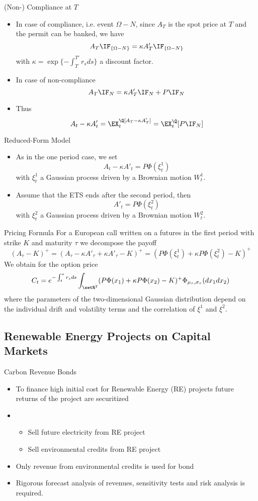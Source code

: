 {(Non-) Compliance at $T$}
\begin{itemize}
\item<1-> In case of compliance, i.e. event $\Omega-N$, since $A_T$ is the spot price at $T$ and the permit can be banked,  we have
$$
A_T\IF_{\{\Omega-N\}}= \kappa A'_T \IF_{\{\Omega-N\}}
$$
with $\kappa= \exp\{-\int_T^{T'}r_s ds\}$ a discount factor.
\item<2-> In case of non-compliance
$$
A_T\IF_{N}= \kappa A'_T \IF_{N} + P\IF_N
$$
\item<3-> Thus
$$
A_t-\kappa A'_t = \EX_t^\Q[A_T-\kappa A'_T]= \EX^\Q_t[P \IF_N]
$$
\end{itemize}



{Reduced-Form Model}
\begin{itemize}
\item<1-> As in the one period case,  we set
$$
A_t-\kappa A'_t = P \Phi(\xi_t^1)
$$
with $\xi^1_t$ a Gaussian process driven by a Brownian motion $W^1_t$.
\item<2-> Assume that the ETS ends after the second period, then
$$
A'_t = P \Phi(\xi^2_t)
$$
with $\xi^2_t$ a Gaussian process driven by a Brownian motion $W^2_t$.
\end{itemize}


{Pricing Formula}
For a European call written on a futures in the first period with strike $K$ and maturity $\tau$ we decompose the payoff
$$
(A_\tau-K)^+= (A_\tau - \kappa A'_\tau + \kappa A'_\tau -K )^+= (P\Phi(\xi^1_t) + \kappa P \Phi(\xi_t^2) -K)^+
$$
We obtain for the option price
$$
C_t = e^{-\int_t^\tau r_s ds} \int_{\setR^2} (P\Phi(x_1)+\kappa P \Phi(x_2) -K)^+ \Phi_{\mu_\tau, \sigma_\tau}(dx_1dx_2)
$$
where the parameters of the two-dimensional Gaussian distribution depend on the individual drift and volatility terms and the correlation
of $\xi^1$ and $\xi^2$.


\subsection{Renewable Energy Projects on Capital Markets}


{Carbon Revenue Bonds}
\begin{itemize}
\item<1-> To finance high initial cost for Renewable Energy (RE) projects future returns of the project are securitized
\item<2->
\begin{itemize}
\item Sell future electricity from RE project
\item Sell environmental credits from RE project
\end{itemize}
\item<3-> Only revenue from environmental credits is used for bond
\item<4-> Rigorous forecast analysis of revenues, sensitivity tests and risk analysis is required.
\end{itemize}




